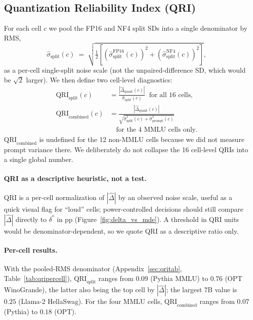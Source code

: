 \documentclass{article}
\begin{document}
\subsection{Quantization Reliability Index (QRI)}
\label{sec:qri}

For each cell $c$ we pool the FP16 and NF4 split SDs into a single denominator by RMS,
\begin{equation}
    \hat\sigma_{\text{split}}(c) \;=\; \sqrt{\tfrac{1}{2}\!\left[(\hat\sigma^{\text{FP16}}_{\text{split}}(c))^2 + (\hat\sigma^{\text{NF4}}_{\text{split}}(c))^2\right]},
\end{equation}
as a per-cell single-split noise scale (not the unpaired-difference SD, which would be $\sqrt{2}$ larger). We then define two cell-level diagnostics:
\begin{align}
    \mathrm{QRI}_{\text{split}}(c) &= \frac{|\hat\Delta_{\text{quant}}(c)|}{\hat\sigma_{\text{split}}(c)} \;\;\text{for all 16 cells,} \\
    \mathrm{QRI}_{\text{combined}}(c) &= \frac{|\hat\Delta_{\text{quant}}(c)|}{\sqrt{\hat\sigma_{\text{split}}^2(c) + \hat\sigma_{\text{prompt}}^2(c)}} \nonumber\\
    & \quad \text{for the 4 MMLU cells only.}
\end{align}
$\mathrm{QRI}_{\text{combined}}$ is undefined for the 12 non-MMLU cells because we did not measure prompt variance there. We deliberately do not collapse the 16 cell-level QRIs into a single global number.

\paragraph{QRI as a descriptive heuristic, not a test.}
QRI is a per-cell normalization of $|\hat\Delta|$ by an observed noise scale, useful as a quick visual flag for ``loud'' cells; power-controlled decisions should still compare $|\hat\Delta|$ directly to $\delta^*$ in pp (Figure~\ref{fig:delta_vs_mde}). A threshold in QRI units would be denominator-dependent, so we quote QRI as a descriptive ratio only.

\paragraph{Per-cell results.}
With the pooled-RMS denominator (Appendix~\ref{sec:qritab}, Table~\ref{tab:qripercell}), $\mathrm{QRI}_{\text{split}}$ ranges from $0.09$ (Pythia MMLU) to $0.76$ (OPT WinoGrande), the latter also being the top cell by $|\hat\Delta|$; the largest 7B value is $0.25$ (Llama-2 HellaSwag). For the four MMLU cells, $\mathrm{QRI}_{\text{combined}}$ ranges from $0.07$ (Pythia) to $0.18$ (OPT).
\end{document}
